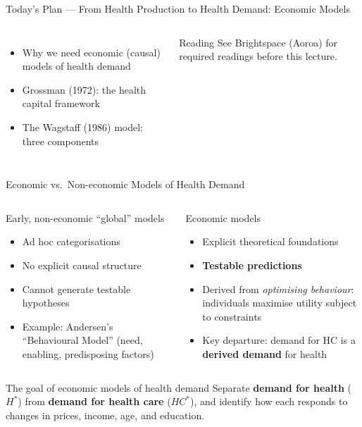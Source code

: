 \documentclass[aspectratio=169, 12pt]{beamer}
\newcommand{\planslide}[2]{%
  \begin{frame}{Today's Plan — #1}
    \begin{columns}
      \column{0.6\textwidth}
      \begin{itemize}#2\end{itemize}
      \column{0.38\textwidth}
      \begin{alertblock}{Reading}
        \footnotesize See Brightspace (Aoroa) for required readings before this lecture.
      \end{alertblock}
    \end{columns}
  \end{frame}}
\begin{document}
\planslide{From Health Production to Health Demand: Economic Models}{
  \item Why we need economic (causal) models of health demand
  \item Grossman (1972): the health capital framework
  \item The Wagstaff (1986) model: three components
}

\begin{frame}{Economic vs.\ Non-economic Models of Health Demand}
  \begin{columns}
      \begin{block}{Early, non-economic ``global'' models}
        \begin{itemize}
          \item Ad hoc categorisations
          \item No explicit causal structure
          \item Cannot generate testable hypotheses
          \item Example: Andersen's ``Behavioural Model'' (need, enabling, predisposing factors)
        \end{itemize}
      \end{block}
      \begin{alertblock}{Economic models}
        \begin{itemize}
          \item Explicit theoretical foundations
          \item \textbf{Testable predictions}
          \item Derived from \emph{optimising behaviour}: individuals maximise utility subject
                to constraints
          \item Key departure: demand for HC is a \textbf{derived demand} for health
        \end{itemize}
      \end{alertblock}
  \end{columns}
  \vspace{0.4em}
  \begin{exampleblock}{The goal of economic models of health demand}
    Separate \textbf{demand for health} ($H^*$) from \textbf{demand for health care} ($HC^*$),
    and identify how each responds to changes in prices, income, age, and education.
  \end{exampleblock}
\end{frame}
\end{document}
